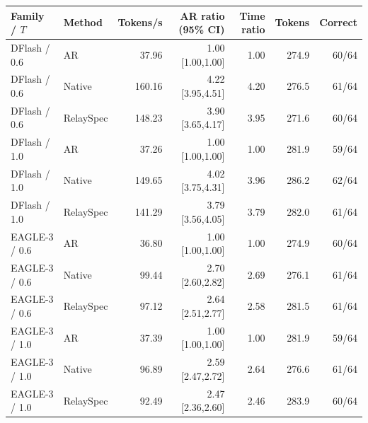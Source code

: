 \begin{tabular}{llrrrrr}
\toprule
Family / $T$ & Method & Tokens/s & AR ratio (95\% CI) & Time ratio & Tokens & Correct \\
\midrule
DFlash / 0.6 & AR & 37.96 & 1.00 [1.00,1.00] & 1.00 & 274.9 & 60/64 \\
DFlash / 0.6 & Native & 160.16 & 4.22 [3.95,4.51] & 4.20 & 276.5 & 61/64 \\
DFlash / 0.6 & RelaySpec & 148.23 & 3.90 [3.65,4.17] & 3.95 & 271.6 & 60/64 \\
\midrule
DFlash / 1.0 & AR & 37.26 & 1.00 [1.00,1.00] & 1.00 & 281.9 & 59/64 \\
DFlash / 1.0 & Native & 149.65 & 4.02 [3.75,4.31] & 3.96 & 286.2 & 62/64 \\
DFlash / 1.0 & RelaySpec & 141.29 & 3.79 [3.56,4.05] & 3.79 & 282.0 & 61/64 \\
\midrule
EAGLE-3 / 0.6 & AR & 36.80 & 1.00 [1.00,1.00] & 1.00 & 274.9 & 60/64 \\
EAGLE-3 / 0.6 & Native & 99.44 & 2.70 [2.60,2.82] & 2.69 & 276.1 & 61/64 \\
EAGLE-3 / 0.6 & RelaySpec & 97.12 & 2.64 [2.51,2.77] & 2.58 & 281.5 & 61/64 \\
\midrule
EAGLE-3 / 1.0 & AR & 37.39 & 1.00 [1.00,1.00] & 1.00 & 281.9 & 59/64 \\
EAGLE-3 / 1.0 & Native & 96.89 & 2.59 [2.47,2.72] & 2.64 & 276.6 & 61/64 \\
EAGLE-3 / 1.0 & RelaySpec & 92.49 & 2.47 [2.36,2.60] & 2.46 & 283.9 & 60/64 \\
\bottomrule
\end{tabular}
